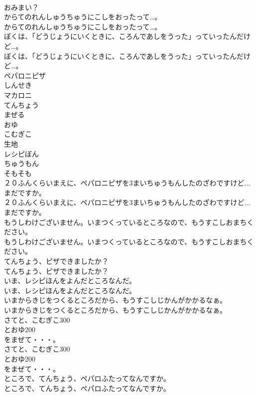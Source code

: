 \documentclass[8pt]{extreport}
\begin{document}
\begin{CJK}{UTF8}{min}
\\	おみまい？
\\	からてのれんしゅうちゅうにこしをおったって…。
\\	からてのれんしゅうちゅうにこしをおったって…。
\\	ぼくは、「どうじょうにいくときに、ころんであしをうった」っていったんだけど…。
\\	ぼくは、「どうじょうにいくときに、ころんであしをうった」っていったんだけど…。
\\	ペパロニピザ
\\	しんせき
\\	マカロニ
\\	てんちょう
\\	まぜる
\\	おゆ
\\	こむぎこ
\\	生地
\\	レシピぼん
\\	ちゅうもん
\\	そもそも
\\	２０ふんくらいまえに、ペパロニピザを3まいちゅうもんしたのざわですけど...まだですか。
\\	２０ふんくらいまえに、ペパロニピザを3まいちゅうもんしたのざわですけど...まだですか。
\\	もうしわけございません。いまつくっているところなので、もうすこしおまちください。
\\	もうしわけございません。いまつくっているところなので、もうすこしおまちください。
\\	てんちょう、ピザできましたか？
\\	てんちょう、ピザできましたか？
\\	いま、レシピほんをよんだところなんだ。
\\	いま、レシピほんをよんだところなんだ。
\\	いまからきじをつくるところだから、もうすこしじかんがかかるなぁ。
\\	いまからきじをつくるところだから、もうすこしじかんがかかるなぁ。
\\	さてと、こむぎこ300
\\	とおゆ200
\\	をまぜて・・・。
\\	さてと、こむぎこ300
\\	とおゆ200
\\	をまぜて・・・。
\\	ところで、てんちょう、ペパロふたってなんですか。
\\	ところで、てんちょう、ペパロふたってなんですか。

\end{CJK}
\end{document}
